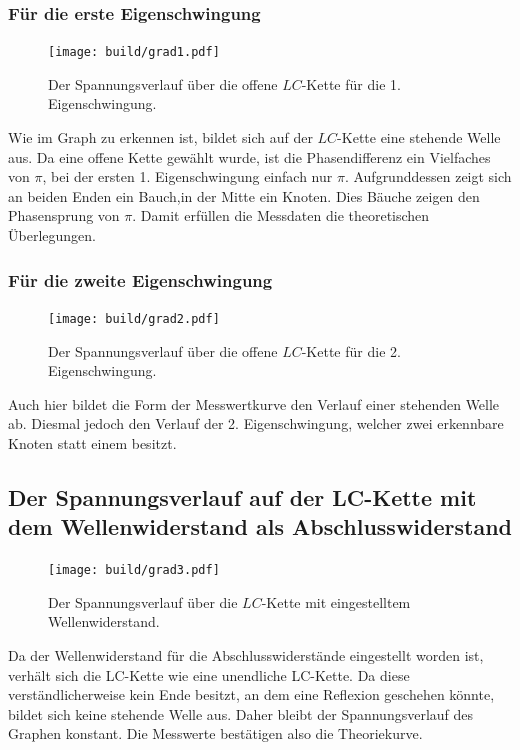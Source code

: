 \subsubsection{Für die erste Eigenschwingung}
\begin{figure}[H]
	\centering
	\caption{Der Spannungsverlauf über die offene $LC$-Kette für die 1. Eigenschwingung.}
	\texttt{[image: build/grad1.pdf]}
	\label{fig:grad1}
\end{figure}
Wie im Graph zu erkennen ist, bildet sich auf der $LC$-Kette eine stehende Welle aus.
 Da eine offene Kette gewählt wurde, ist die Phasendifferenz ein Vielfaches
  von $\pi$, bei der ersten 1. Eigenschwingung einfach nur $\pi$. Aufgrunddessen zeigt
 sich an beiden Enden ein Bauch,in der Mitte ein Knoten. Dies Bäuche zeigen
  den Phasensprung von $\pi$. Damit erfüllen die Messdaten die
theoretischen Überlegungen.
\subsubsection{Für die zweite Eigenschwingung}
\begin{figure}[H]
	\centering
	\caption{Der Spannungsverlauf über die offene $LC$-Kette für die 2. Eigenschwingung.}
	\texttt{[image: build/grad2.pdf]}
	\label{fig:grad2}
\end{figure}
Auch hier bildet die Form der Messwertkurve den Verlauf einer stehenden Welle ab.
 Diesmal jedoch den Verlauf der 2. Eigenschwingung, welcher zwei erkennbare Knoten statt einem besitzt.

\subsection{Der Spannungsverlauf auf der LC-Kette mit dem Wellenwiderstand als Abschlusswiderstand}
\begin{figure}[H]
	\centering
	\caption{Der Spannungsverlauf über die $LC$-Kette mit eingestelltem Wellenwiderstand.}
	\texttt{[image: build/grad3.pdf]}
	\label{fig:grad3}
\end{figure}

Da der Wellenwiderstand für die Abschlusswiderstände eingestellt worden ist,
verhält sich die LC-Kette wie eine unendliche LC-Kette. Da diese verständlicherweise
 kein Ende besitzt, an dem eine Reflexion geschehen könnte, bildet sich keine stehende Welle aus.
  Daher bleibt der Spannungsverlauf des Graphen konstant. Die Messwerte
   bestätigen also die Theoriekurve.
